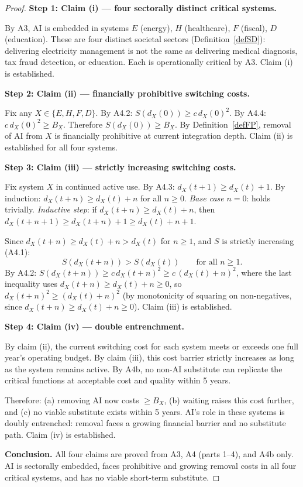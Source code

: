 \documentclass[12pt]{article}
\begin{document}
\begin{proof}

\noindent\textbf{Step 1: Claim (i) — four sectorally distinct critical systems.}

By A3, AI is embedded in systems $E$ (energy), $H$ (healthcare),
$F$ (fiscal), $D$ (education).  These are four distinct societal sectors
(Definition~\ref{defSD}): delivering electricity management is not the
same as delivering medical diagnosis, tax fraud detection, or education.
Each is operationally critical by A3.  Claim (i) is established.

\medskip
\noindent\textbf{Step 2: Claim (ii) — financially prohibitive switching costs.}

Fix any $X \in \{E,H,F,D\}$.  By A4.2: $S(d_X(0)) \geq c\,d_X(0)^2$.
By A4.4: $c\,d_X(0)^2 \geq B_X$.  Therefore $S(d_X(0)) \geq B_X$.
By Definition~\ref{defFP}, removal of AI from $X$ is financially
prohibitive at current integration depth.  Claim (ii) is established
for all four systems.

\medskip
\noindent\textbf{Step 3: Claim (iii) — strictly increasing switching costs.}

Fix system $X$ in continued active use.  By A4.3: $d_X(t+1) \geq d_X(t)+1$.
By induction: $d_X(t+n) \geq d_X(t) + n$ for all $n \geq 0$.
\emph{Base case} $n=0$: holds trivially.
\emph{Inductive step}: if $d_X(t+n) \geq d_X(t)+n$, then
$d_X(t+n+1) \geq d_X(t+n)+1 \geq d_X(t)+n+1$.

Since $d_X(t+n) \geq d_X(t)+n > d_X(t)$ for $n \geq 1$, and $S$ is
strictly increasing (A4.1):
\[
  S(d_X(t+n)) > S(d_X(t)) \qquad \text{for all } n \geq 1.
\]
By A4.2: $S(d_X(t+n)) \geq c\,d_X(t+n)^2 \geq c\,(d_X(t)+n)^2$,
where the last inequality uses $d_X(t+n) \geq d_X(t)+n \geq 0$,
so $d_X(t+n)^2 \geq (d_X(t)+n)^2$ (by monotonicity of squaring on
non-negatives, since $d_X(t+n) \geq d_X(t)+n \geq 0$).
Claim (iii) is established.

\medskip
\noindent\textbf{Step 4: Claim (iv) — double entrenchment.}

By claim (ii), the current switching cost for each system meets or
exceeds one full year's operating budget.  By claim (iii), this cost
barrier strictly increases as long as the system remains active.
By A4b, no non-AI substitute can replicate the critical functions at
acceptable cost and quality within 5 years.

Therefore: (a) removing AI now costs $\geq B_X$, (b) waiting raises
this cost further, and (c) no viable substitute exists within 5 years.
AI's role in these systems is doubly entrenched: removal faces a
growing financial barrier and no substitute path.  Claim (iv) is
established.

\medskip
\noindent\textbf{Conclusion.}
All four claims are proved from A3, A4 (parts 1--4), and A4b only.
AI is sectorally embedded, faces prohibitive and growing removal costs
in all four critical systems, and has no viable short-term substitute.
\end{proof}
\end{document}
